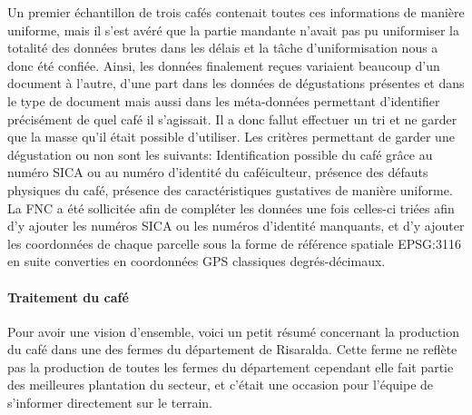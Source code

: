 \noindent Un premier échantillon de trois cafés contenait toutes ces informations de manière uniforme, mais il s'est avéré que la partie mandante n'avait pas pu uniformiser la totalité des données brutes dans les délais et la tâche d'uniformisation nous a donc été confiée. Ainsi, les données finalement reçues variaient beaucoup d'un document à l'autre, d'une part dans les données de dégustations présentes et dans le type de document mais aussi dans les méta-données permettant d'identifier précisément de quel café il s'agissait. Il a donc fallut effectuer un tri et ne garder que la masse qu'il était possible d'utiliser. Les critères permettant de garder une dégustation ou non sont les suivants: Identification possible du café grâce au numéro SICA ou au numéro d'identité du caféiculteur, présence des défauts physiques du café, présence des caractéristiques gustatives de manière uniforme. La FNC a été sollicitée afin de compléter les données une fois celles-ci triées afin d'y ajouter les numéros SICA ou les numéros d'identité manquants, et d'y ajouter les coordonnées de chaque parcelle sous la forme de référence spatiale EPSG:3116 en suite converties en coordonnées GPS classiques degrés-décimaux.\\

\paragraph{Traitement du café} Pour avoir une vision d'ensemble, voici un petit résumé concernant la production du café dans une des fermes du département de Risaralda. Cette ferme ne reflète pas la production de toutes les fermes du département cependant elle fait partie des meilleures plantation du secteur, et c'était une occasion pour l'équipe de s'informer directement sur le terrain. \\

